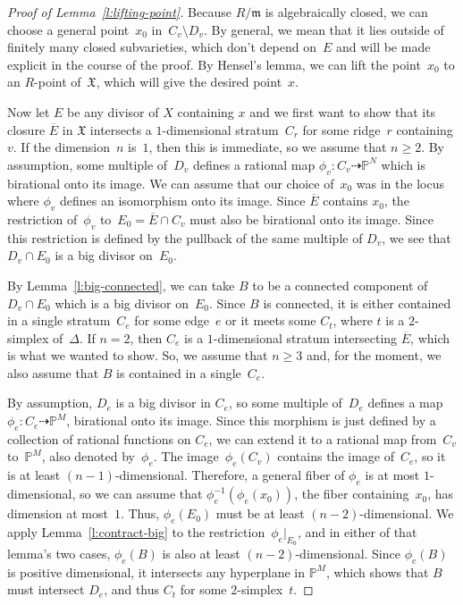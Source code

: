 \documentclass[11pt]{amsart}
\theoremstyle{definition}
\newcommand{\m}{\mathfrak m}
\newcommand{\PP}{\mathbb P}
\newcommand{\X}{\mathfrak X}
\begin{document}
\begin{proof}[Proof of Lemma~\ref{l:lifting-point}]
Because $R/\m$ is algebraically closed, we can choose a general point~$x_0$
in~$C_v \setminus D_v$. By general, we mean that it lies outside of finitely
many closed subvarieties, which don't depend on~$E$ and will be made explicit in
the course of the proof. By Hensel's lemma, we can lift the point~$x_0$ to an
$R$-point of~$\X$, which will give the desired point~$x$.

Now let $E$ be any divisor of $X$ containing $x$ and we first want to show
that its closure $\overline E$ in $\X$ intersects a $1$-dimensional
stratum~$C_r$ for some ridge~$r$ containing $v$. If the dimension~$n$ is~$1$, then this is immediate, so we assume
that $n \geq 2$. By assumption, some multiple of~$D_v$ defines a rational map
$\phi_v \colon C_v \dashrightarrow \PP^N$ which is birational onto its image. We
can assume that our choice of~$x_0$ was in the locus where $\phi_v$ defines an
isomorphism onto its image. Since $\overline E$ contains $x_0$, the restriction
of~$\phi_v$ to~$E_0 = \overline E \cap C_v$ must also be birational onto its
image. Since this restriction is defined by the pullback of the same multiple of
$D_v$, we see that $D_v \cap E_0$ is a big divisor on~$E_0$.

By Lemma~\ref{l:big-connected}, we can take $B$ to be a connected component of
$D_v \cap E_0$ which is a big divisor on~$E_0$. Since $B$ is connected, it is
either contained in a single stratum~$C_e$ for some edge~$e$ or it meets some $C_t$,
where $t$ is a $2$-simplex of~$\Delta$. If $n=2$, then $C_e$ is a
$1$-dimensional stratum intersecting $\overline E$, which is what we wanted to
show. So, we assume that $n \geq 3$ and, for the moment, we also assume that $B$
is contained in a single~$C_e$.

By assumption, $D_e$ is a big divisor in $C_e$, so some multiple of~$D_e$
defines a map $\phi_e \colon C_e \dashrightarrow \PP^M$, birational onto its
image. Since this
morphism is just defined by a collection of rational functions on $C_e$, we can
extend it to a rational map from~$C_v$ to~$\PP^M$, also denoted
by~$\phi_e$. The image~$\phi_e(C_v)$ contains the image of~$C_e$, so it is at
least $(n-1)$-dimensional. Therefore, a general fiber of $\phi_e$ is at most
$1$-dimensional, so we can assume that $\phi_e^{-1}(\phi_e(x_0))$, the fiber
containing~$x_0$, has dimension at most~$1$. Thus, $\phi_e(E_0)$ must be at
least $(n-2)$-dimensional. We apply Lemma~\ref{l:contract-big} to the
restriction~$\phi_e\vert_{E_0}$, and in either of that lemma's two
cases, $\phi_e(B)$ is also at least $(n-2)$-dimensional. Since $\phi_e(B)$ is
positive dimensional, it intersects any hyperplane in $\PP^M$, which shows that
$B$ must intersect $D_e$, and thus $C_t$ for some $2$-simplex~$t$.


\end{proof}
\end{document}

